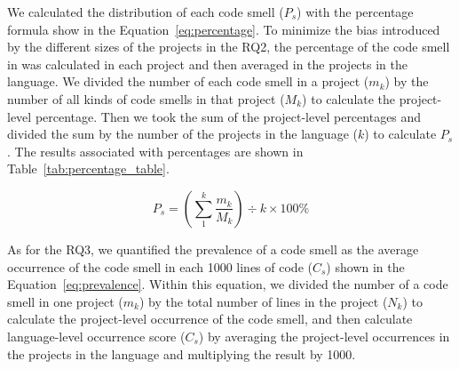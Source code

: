 

We calculated the distribution of each code smell ($P_{s}$) with the percentage
formula show in the Equation~\ref{eq:percentage}. To minimize the bias
introduced by the different sizes of the projects in the RQ2, the percentage of
the code smell in was calculated in each project and then averaged in the
projects in the language. We divided the number of each code smell in a project
($m_{k}$) by the number of all kinds of code smells in that project ({$M_{k}$})
to calculate the project-level percentage. Then we took the sum of the
project-level percentages and divided the sum by the number of the projects in
the language ($k$) to calculate $P_{s}$. The results associated with percentages
are shown in Table~\ref{tab:percentage_table}.


\begin{equation}
P_{s} = \left( \sum_{1}^{k}\frac{{m_{k}}}{M_{k}} \right) \div {k} \times 100\%
\label{eq:percentage}
\end{equation}


As for the RQ3, we quantified the prevalence of a code smell as the average
occurrence of the code smell in each 1000 lines of code ($C_{s}$) shown in the
Equation~\ref{eq:prevalence}. Within this equation, we divided the number of a
code smell in one project ($m_{k}$) by the total number of lines in the project
($N_{k}$) to calculate the project-level occurrence of the code smell, and then
calculate language-level occurrence score ($C_{s}$) by averaging the
project-level occurrences in the projects in the language and multiplying the
result by 1000.

